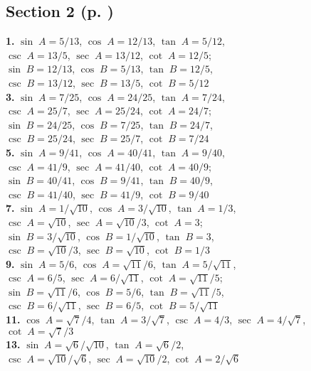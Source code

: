 {\begin{multicols}{2}
\subsection*{Section 2 (p. \pageref{sec1dot2})}
\textbf{1.} $\sin\;A = 5/13$, $\cos\;A = 12/13$, $\tan\;A = 5/12$,\\
$\csc\;A = 13/5$, $\sec\;A = 13/12$, $\cot\;A = 12/5$;\\
$\sin\;B = 12/13$, $\cos\;B = 5/13$, $\tan\;B = 12/5$,\\
$\csc\;B = 13/12$, $\sec\;B = 13/5$, $\cot\;B = 5/12$\\
\textbf{3.} $\sin\;A = 7/25$, $\cos\;A = 24/25$, $\tan\;A = 7/24$,\\
$\csc\;A = 25/7$, $\sec\;A = 25/24$, $\cot\;A = 24/7$;\\
$\sin\;B = 24/25$, $\cos\;B = 7/25$, $\tan\;B = 24/7$,\\
$\csc\;B = 25/24$, $\sec\;B = 25/7$, $\cot\;B = 7/24$\\
\textbf{5.} $\sin\;A = 9/41$, $\cos\;A = 40/41$, $\tan\;A = 9/40$,\\
$\csc\;A = 41/9$, $\sec\;A = 41/40$, $\cot\;A = 40/9$;\\
$\sin\;B = 40/41$, $\cos\;B = 9/41$, $\tan\;B = 40/9$,\\
$\csc\;B = 41/40$, $\sec\;B = 41/9$, $\cot\;B = 9/40$\\
\textbf{7.} $\sin\;A = 1/\sqrt{10}$, $\cos\;A = 3/\sqrt{10}$, $\tan\;A = 1/3$,\\
$\csc\;A = \sqrt{10}$, $\sec\;A = \sqrt{10}/3$, $\cot\;A = 3$;\\
$\sin\;B = 3/\sqrt{10}$, $\cos\;B = 1/\sqrt{10}$, $\tan\;B = 3$,\\
$\csc\;B = \sqrt{10}/3$, $\sec\;B = \sqrt{10}$, $\cot\;B = 1/3$\\
\textbf{9.} $\sin\;A = 5/6$, $\cos\;A = \sqrt{11}/6$, $\tan\;A = 5/\sqrt{11}$,\\
$\csc\;A = 6/5$, $\sec\;A = 6/\sqrt{11}$, $\cot\;A = \sqrt{11}/5$;\\
$\sin\;B = \sqrt{11}/6$, $\cos\;B = 5/6$, $\tan\;B = \sqrt{11}/5$,\\
$\csc\;B = 6/\sqrt{11}$, $\sec\;B = 6/5$, $\cot\;B = 5/\sqrt{11}$\\
\textbf{11.} $\cos\;A = \sqrt{7}/4$, $\tan\;A = 3/\sqrt{7}$,
$\csc\;A = 4/3$, $\sec\;A = 4/\sqrt{7}$, $\cot\;A = \sqrt{7}/3$\\
\textbf{13.} $\sin\;A = \sqrt{6}/\sqrt{10}$, $\tan\;A = \sqrt{6}/2$,\\
$\csc\;A = \sqrt{10}/\sqrt{6}$, $\sec\;A = \sqrt{10}/2$, $\cot\;A = 2/\sqrt{6}$\\

\end{multicols}}
